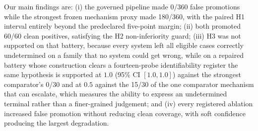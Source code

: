 Our main findings are: (i) the governed pipeline made 0/360 false promotions while the strongest frozen mechanism proxy made 180/360, with the paired H1 interval entirely beyond the predeclared five-point margin; (ii) both promoted 60/60 clean positives, satisfying the H2 non-inferiority guard; (iii) H3 was not supported on that battery, because every system left all eligible cases correctly undetermined on a family that no system could get wrong, while on a repaired battery whose construction clears a fourteen-probe identifiability register the same hypothesis is supported at $1.0$ (95\% CI $[1.0,1.0]$) against the strongest comparator's 0/30 and at $0.5$ against the 15/30 of the one comparator mechanism that can escalate, which measures the ability to express an undetermined terminal rather than a finer-grained judgement; and (iv) every registered ablation increased false promotion without reducing clean coverage, with soft confidence producing the largest degradation.

